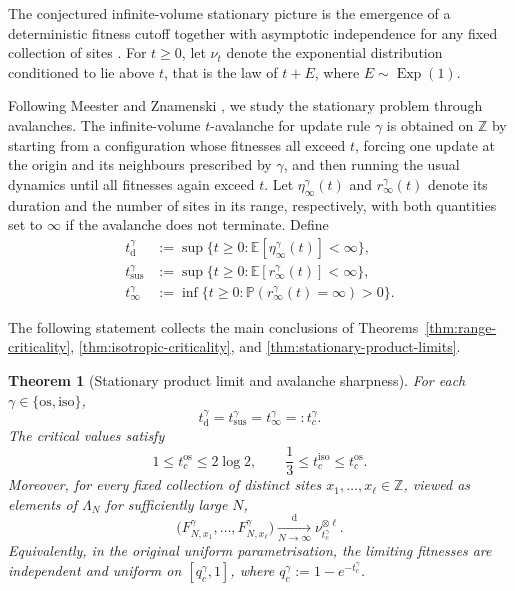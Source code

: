 \documentclass[11pt,a4paper]{amsart}
\newtheorem*{maintheorem}{Theorem}
\theoremstyle{remark}
\begin{document}
The conjectured infinite-volume stationary picture is the emergence of a
deterministic fitness cutoff together with asymptotic independence for any
fixed collection of sites \cite{BS93,PMB96,MZ04}.
For $t\geq0$, let $\nu_t$ denote the exponential distribution conditioned
to lie above $t$, that is the law of $t+E$, where
$E\sim\operatorname{Exp}(1)$.

Following Meester and Znamenski \cite{MZ03,MZ04}, we study the stationary
problem through avalanches. The infinite-volume $t$-avalanche for update
rule $\gamma$ is obtained on $\mathbb Z$ by starting from a configuration
whose fitnesses all exceed $t$, forcing one update at the origin and its
neighbours prescribed by $\gamma$, and then running the usual dynamics
until all fitnesses again exceed $t$.
Let $\eta_\infty^\gamma(t)$ and
$r_\infty^\gamma(t)$ denote its duration and the number of sites in its
range, respectively, with both quantities set to $\infty$ if the avalanche
does not terminate. Define
\[
\begin{aligned}
        t_{\mathrm d}^\gamma
        &:=
        \sup\{t\geq0:
        \mathbb E[\eta_\infty^\gamma(t)]<\infty\},\\
        t_{\mathrm{sus}}^\gamma
        &:=
        \sup\{t\geq0:
        \mathbb E[r_\infty^\gamma(t)]<\infty\},\\
        t_\infty^\gamma
        &:=
        \inf\{t\geq0:
        \mathbb P(r_\infty^\gamma(t)=\infty)>0\}.
\end{aligned}
\]

The following statement collects the main conclusions of
Theorems~\ref{thm:range-criticality},
\ref{thm:isotropic-criticality}, and
\ref{thm:stationary-product-limits}.


\begin{maintheorem}[Stationary product limit and avalanche sharpness]
For each $\gamma\in\{\mathrm{os},\mathrm{iso}\}$,
\[
        t_{\mathrm d}^\gamma
        =t_{\mathrm{sus}}^\gamma
        =t_\infty^\gamma
        =:t_c^\gamma.
\]
The critical values satisfy
\[
        1\leq t_c^{\mathrm{os}}\leq2\log2,
        \qquad
        \frac13\leq t_c^{\mathrm{iso}}
        \leq t_c^{\mathrm{os}}.
\]
Moreover, for every fixed collection of distinct sites
$x_1,\ldots,x_\ell\in\mathbb Z$, viewed as elements of $\Lambda_N$ for sufficiently large $N$,
\[
        \bigl(
        F_{N,x_1}^\gamma,\ldots,F_{N,x_\ell}^\gamma
        \bigr)
        \xrightarrow[N\to\infty]{\mathrm d}
        \nu_{t_c^\gamma}^{\otimes\ell}.
\]
Equivalently, in the original uniform parametrisation, the limiting
fitnesses are independent and uniform on $[q_c^\gamma,1]$, where
$q_c^\gamma:=1-e^{-t_c^\gamma}$.
\end{maintheorem}
\end{document}
